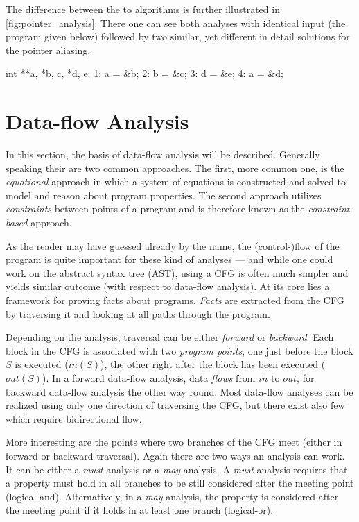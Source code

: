\documentclass[article]{uibk}
\begin{document}
The difference between the to algorithms is further illustrated in
\cref{fig:pointer_analysis}. There one can see both analyses with identical
input (the program given below) followed by two similar, yet different in
detail solutions for the pointer aliasing.

\begin{ccode}
    int **a, *b, c, *d, e;
    1: a = &b;
    2: b = &c;
    3: d = &e;
    4: a = &d;
\end{ccode}

\section{Data-flow Analysis}
\label{sec:dataflow}

In this section, the basis of data-flow analysis will be described. Generally
speaking their are two common approaches. The first, more common one, is the
\textit{equational} approach in which a system of equations is constructed and
solved to model and reason about program properties. The second approach
utilizes \textit{constraints} between points of a program and is therefore
known as the \textit{constraint-based} approach.

As the reader may have guessed already by the name, the (control-)flow of the
program is quite important for these kind of analyses --- and while one could
work on the abstract syntax tree (AST), using a CFG is often much simpler and
yields similar outcome (with respect to data-flow analysis). At its core lies a
framework for proving facts about programs. \textit{Facts} are extracted from
the CFG by traversing it and looking at all paths through the
program.~\cite{slides:dataflow}

Depending on the analysis, traversal can be either \textit{forward} or
\textit{backward}. Each block in the CFG is associated with two \textit{program
points}, one just before the block $S$ is executed ($in(S)$), the other right
after the block has been executed ($out(S)$). In a forward data-flow analysis,
data \emph{flows} from $in$ to $out$, for backward data-flow analysis the other
way round. Most data-flow analyses can be realized using only one direction of
traversing the CFG, but there exist also few which require bidirectional flow.

More interesting are the points where two branches of the CFG meet (either in
forward or backward traversal). Again there are two ways an analysis can work.
It can be either a \textit{must} analysis or a \textit{may} analysis. A
\textit{must} analysis requires that a property must hold in all branches to be
still considered after the meeting point (logical-and). Alternatively, in a
\textit{may} analysis, the property is considered after the meeting point if
it holds in at least one branch (logical-or).
\end{document}
